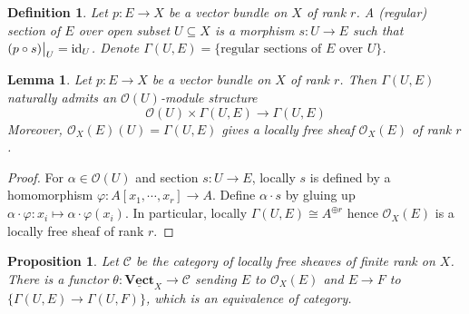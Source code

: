 \documentclass{ctexart}
\newtheorem{definition}{Definition}[section]
\newtheorem{proposition}{Proposition}[section]
\newtheorem{lemma}{Lemma}[section]
\newcommand{\identity}{\operatorname{id}}
\newcommand{\vectorbundle}{\underline{\mathbf{Vect}}}
\begin{document}
\begin{definition}
    Let $p: E \rightarrow X$ be a vector bundle on $X$ of rank $r$.
    A (regular) section of $E$ over open subset $U \subseteq X$ is a morphism $s: U \rightarrow E$ such that $(p \circ s)\big{|}_{U} = \identity_{U}$.
    Denote $\Gamma(U, E) = \{\text{regular sections of $E$ over $U$}\}$.
\end{definition}
\begin{lemma}
    Let $p: E \rightarrow X$ be a vector bundle on $X$ of rank $r$.
    Then $\Gamma(U, E)$ naturally admits an $\mathcal{O}(U)$-module structure
    \begin{equation}
        \mathcal{O}(U) \times \Gamma(U, E) \longrightarrow \Gamma(U, E)
    \end{equation}
    Moreover, $\mathcal{O}_{X}(E)(U) = \Gamma(U, E)$ gives a locally free sheaf $\mathcal{O}_{X}(E)$ of rank $r$.
    \label{Lemma 1.6}
\end{lemma}
\begin{proof}
    For $\alpha\in \mathcal{O}(U)$ and section $s: U \rightarrow E$, locally $s$ is defined by a homomorphism $\varphi: A[x_{1}, \cdots, x_{r}] \rightarrow A$.
    Define $\alpha \cdot s$ by gluing up $\alpha \cdot \varphi: x_{i} \mapsto \alpha \cdot \varphi(x_{i})$.
    In particular, locally $\Gamma(U, E) \cong A^{\oplus r}$ hence $\mathcal{O}_{X}(E)$ is a locally free sheaf of rank $r$. 
\end{proof}
\begin{proposition}
    Let $\mathcal{C}$ be the category of locally free sheaves of finite rank on $X$.
    There is a functor $\theta: \vectorbundle_{X} \rightarrow \mathcal{C}$ sending $E$ to $\mathcal{O}_{X}(E)$ and $E \rightarrow F$ to $\{\Gamma(U, E) \rightarrow \Gamma(U, F)\}$,
    which is an equivalence of category.
    \label{Proposition 1.14}
\end{proposition}
\end{document}
